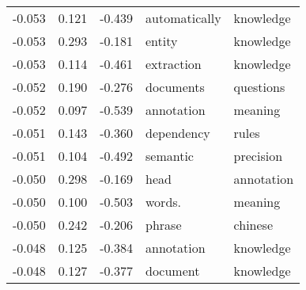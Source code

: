 \begin{tabular}{cccp{5cm}p{5cm}}
-0.053 & 0.121 & -0.439 & automatically & knowledge \\
-0.053 & 0.293 & -0.181 & entity & knowledge \\
-0.053 & 0.114 & -0.461 & extraction & knowledge \\
-0.052 & 0.190 & -0.276 & documents & questions \\
-0.052 & 0.097 & -0.539 & annotation & meaning \\
-0.051 & 0.143 & -0.360 & dependency & rules \\
-0.051 & 0.104 & -0.492 & semantic & precision \\
-0.050 & 0.298 & -0.169 & head & annotation \\
-0.050 & 0.100 & -0.503 & words. & meaning \\
-0.050 & 0.242 & -0.206 & phrase & chinese \\
-0.048 & 0.125 & -0.384 & annotation & knowledge \\
-0.048 & 0.127 & -0.377 & document & knowledge \\
\bottomrule
\end{tabular}
